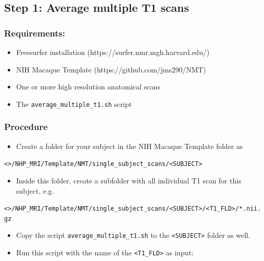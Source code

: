 \documentclass[11pt]{article}
\providecommand{\tightlist}{%
      \setlength{\itemsep}{0pt}\setlength{\parskip}{0pt}}
\begin{document}
    \hypertarget{step-1-average-multiple-t1-scans}{%
\subsection{\texorpdfstring{\textbf{Step 1: Average multiple T1
scans}}{Step 1: Average multiple T1 scans}}\label{step-1-average-multiple-t1-scans}}

\hypertarget{requirements}{%
\subsubsection{Requirements:}\label{requirements}}

\begin{itemize}
\item
  Freesurfer installation (https://surfer.nmr.mgh.harvard.edu/)
\item
  NIH Macaque Template (https://github.com/jms290/NMT)
\item
  One or more high resolution anatomical scans
\item
  The \texttt{average\_multiple\_t1.sh} script
\end{itemize}

    \hypertarget{procedure}{%
\subsubsection{Procedure}\label{procedure}}

\begin{itemize}
\tightlist
\item
  Create a folder for your subject in the NIH Macaque Template folder as
\end{itemize}

\texttt{\textless{}\textgreater{}/NHP\_MRI/Template/NMT/single\_subject\_scans/\textless{}SUBJECT\textgreater{}}

\begin{itemize}
\tightlist
\item
  Inside this folder, create a subfolder with all individual T1 scan for
  this subject, e.g.
\end{itemize}

\texttt{\textless{}\textgreater{}/NHP\_MRI/Template/NMT/single\_subject\_scans/\textless{}SUBJECT\textgreater{}/\textless{}T1\_FLD\textgreater{}/*.nii.gz}

\begin{itemize}
\item
  Copy the script \texttt{average\_multiple\_t1.sh} to the
  \texttt{\textless{}SUBJECT\textgreater{}} folder as well.
\item
  Run this script with the name of the
  \texttt{\textless{}T1\_FLD\textgreater{}} as input:
\end{itemize}
\end{document}
